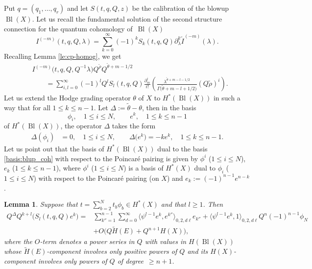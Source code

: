 \documentclass[10pt,a4paper]{article}
\numberwithin{equation}{section}
\newtheorem{Lemma}[Theorem]{Lemma}
\begin{document}
Put $q=(q_1,\dots, q_r)$ and let $S(t,q,Q,z)$ be the calibration of
the blowup $\operatorname{Bl}(X)$. Let us recall the fundamental solution of
the second structure connection for the quantum cohomology of~$\operatorname{Bl}(X)$
\[
I^{(-m)}(t,q,Q,\lambda) = \sum_{k=0}^\infty (-1)^k
S_k(t,q,Q) \partial_\lambda^k
\widetilde{I}^{(-m)}(\lambda).
\]
Recalling Lemma \ref{le:cp-homog}, we get
\begin{align}
&
I^{(-m)}\big(t,q,Q,Q^{-1}\lambda\big)
Q^{\widetilde{\rho}}
Q^{\widetilde{\theta}+m-1/2} \nonumber \\
&\qquad=
\sum_{i,l=0}^\infty (-1)^l
Q^l S_l(t,q,Q) \frac{\partial^i_m}{i!} \left(
\frac{\lambda^{\widetilde{\theta}+m-l-1/2}}{
\Gamma\big(\widetilde{\theta}+m-l+1/2\big)} (Q \widetilde{\rho})^i
\right).\label{pv-homog}
\end{align}
Let us extend the Hodge grading operator $\theta$ of $X$ to
$H^*(\operatorname{Bl}(X))$ in such a way that
for all $1\leq k\leq n-1$. Let $\Delta:=\widetilde{\theta}-\theta$,
then in the basis
\begin{equation}\label{basis:blup_coh}
\phi_i,\quad 1\leq i\leq N, \qquad
e^k,\quad 1\leq k\leq n-1
\end{equation}
of $H^*(\operatorname{Bl}(X))$, the operator $\Delta$ takes the form
\begin{align*}
\Delta(\phi_i) & = 0, \quad 1\leq i\leq N,\qquad
\Delta\big(e^k\big) = -k e^k, \quad 1\leq k\leq n-1.
\end{align*}
Let us point out that the basis of $H^*(\operatorname{Bl}(X))$ dual to the basis
\eqref{basis:blup_coh} with respect to the Poincar\'e pairing is given by
$\phi^i$ ($1\leq i\leq N$),
$e_k$ ($1\leq k\leq n-1$),
where $\phi^i$ ($1\leq i\leq N$) is a basis of $H^*(X)$
dual to $\phi_i$ ($1\leq i\leq N$) with respect to the Poincar\'e pairing
(on $X$) and $e_k:= (-1)^{n-1} e^{n-k}$.
\begin{Lemma}\label{le:calibr_Q-homog}
Suppose that $t=\sum_{b=2}^N t_b \phi_b\in H^*(X)$ and that $l\geq 1$. Then
\begin{align*}
Q^\Delta Q^{k+l} \big(S_l(t,q,Q) e^k\big) ={} &
\sum_{k''=1}^{n-1} \sum_{d=0}^\infty
\big\langle \psi^{l-1} e^k, e^{k''}\big\rangle_{0,2,d\ell} e_{k''} +
\big\langle \psi^{l-1} e^k, 1\big\rangle_{0,2,d\ell} Q^n (-1)^{n-1}\phi_N \\
& +O\big(Q\widetilde{H}(E) + Q^{n+1} H(X)\big),
\end{align*}
where the $O$-term denotes a power series in $Q$ with values in $H(\operatorname{Bl}(X))$ whose $\widetilde{H}(E)$-component involves only positive
powers of $Q$ and its $H(X)$-component involves only powers of $Q$ of degree~${\geq n+1}$.
\end{Lemma}
\end{document}
